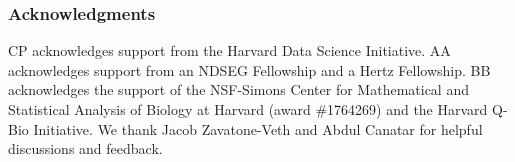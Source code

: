 \documentclass{article} %
\begin{document}


\subsubsection*{Acknowledgments}
CP acknowledges support from the Harvard Data Science Initiative. AA acknowledges support from an NDSEG Fellowship and a Hertz Fellowship. BB acknowledges the support of the NSF-Simons Center for Mathematical and Statistical Analysis of Biology at Harvard (award \#1764269) and the Harvard Q-Bio Initiative. We thank Jacob Zavatone-Veth and Abdul Canatar for helpful discussions and feedback.




\end{document}
